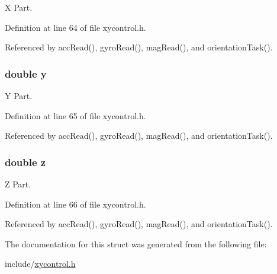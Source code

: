 X Part. 



Definition at line 64 of file xycontrol.\-h.



Referenced by acc\-Read(), gyro\-Read(), mag\-Read(), and orientation\-Task().

\hypertarget{struct_vector3f_ab927965981178aa1fba979a37168db2a}{
\subsubsection[{y}]{\setlength{\rightskip}{0pt plus 5cm}double y}}\label{struct_vector3f_ab927965981178aa1fba979a37168db2a}


Y Part. 



Definition at line 65 of file xycontrol.\-h.



Referenced by acc\-Read(), gyro\-Read(), mag\-Read(), and orientation\-Task().

\hypertarget{struct_vector3f_ab3e6ed577a7c669c19de1f9c1b46c872}{
\subsubsection[{z}]{\setlength{\rightskip}{0pt plus 5cm}double z}}\label{struct_vector3f_ab3e6ed577a7c669c19de1f9c1b46c872}


Z Part. 



Definition at line 66 of file xycontrol.\-h.



Referenced by acc\-Read(), gyro\-Read(), mag\-Read(), and orientation\-Task().



The documentation for this struct was generated from the following file\-:\begin{DoxyCompactItemize}
\item 
include/\hyperlink{xycontrol_8h}{xycontrol.\-h}\end{DoxyCompactItemize}

